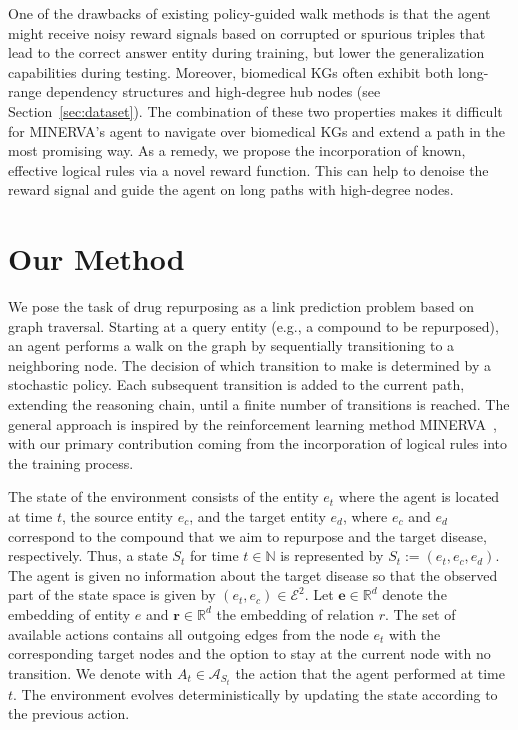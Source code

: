 \documentclass{article}
\begin{document}
One of the drawbacks of existing policy-guided walk methods is that the agent might receive noisy reward signals based on corrupted or spurious triples that lead to the correct answer entity during training, but lower the generalization capabilities during testing. Moreover, biomedical KGs often exhibit both long-range dependency structures and high-degree hub nodes (see Section~\ref{sec:dataset}). %
The combination of these two properties makes it difficult for MINERVA's agent to navigate over biomedical KGs and extend a path in the most promising way. As a remedy, we propose the incorporation of known, effective logical rules via a novel reward function. This can help to denoise the reward signal and guide the agent on long paths with high-degree nodes.


\fi

\section{Our Method}
\label{sec:our_method}

We pose the task of drug repurposing as a link prediction problem based on graph traversal. Starting at a query entity (e.g., a compound to be repurposed), an agent performs a walk on the graph by sequentially transitioning to a neighboring node. The decision of which transition to make is determined by a stochastic policy. Each subsequent transition is added to the current path, extending the reasoning chain, until a finite number of transitions is reached. 
The general approach is inspired by the reinforcement learning method MINERVA~\cite{minerva}, with our primary contribution coming from the incorporation of logical rules into the training process.%

\sloppy 
The state of the environment consists of the entity $e_t$ where the agent is located at time $t$, the source entity $e_c$, and the target entity $e_d$, where $e_c$ and $e_d$ correspond to the compound that we aim to repurpose and the target disease, respectively. %
Thus, a state $S_t$ for time $t \in \mathbb{N}$ is represented by $S_t := \left(e_t, e_c, e_d\right)$. The agent is given no information about the target disease so that the observed part of the state space is given by $\left(e_t, e_c\right) \in \mathcal{E}^2$.
Let $\boldsymbol{e} \in \mathbb{R}^{d}$ denote the embedding of entity $e$ and $\boldsymbol{r} \in \mathbb{R}^{d}$ the embedding of relation $r$.
The set of available actions contains all outgoing edges from the node $e_t$ with the corresponding target nodes and the option to stay at the current node with no transition. We denote with $A_t \in \mathcal{A}_{S_t}$ the action that the agent performed at time $t$. The environment evolves deterministically by updating the state according to the previous action. 
\end{document}
